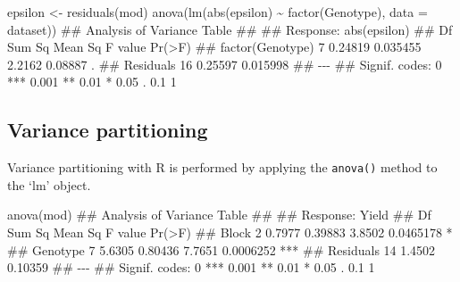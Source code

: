 \documentclass[a4paper,12pt,oneside]{book}
\newenvironment{Shaded}{\begin{snugshade}}{\end{snugshade}}
\newcommand{\SpecialCharTok}[1]{#1}
\newcommand{\DocumentationTok}[1]{#1}
\newcommand{\OtherTok}[1]{#1}
\newcommand{\FunctionTok}[1]{#1}
\newcommand{\AttributeTok}[1]{#1}
\newcommand{\NormalTok}[1]{#1}
\begin{document}
\vspace{12pt}

\begin{Shaded}
\begin{Highlighting}[]
\NormalTok{epsilon }\OtherTok{\textless{}{-}} \FunctionTok{residuals}\NormalTok{(mod)}
\FunctionTok{anova}\NormalTok{(}\FunctionTok{lm}\NormalTok{(}\FunctionTok{abs}\NormalTok{(epsilon) }\SpecialCharTok{\textasciitilde{}} \FunctionTok{factor}\NormalTok{(Genotype), }\AttributeTok{data =}\NormalTok{ dataset))}
\DocumentationTok{\#\# Analysis of Variance Table}
\DocumentationTok{\#\# }
\DocumentationTok{\#\# Response: abs(epsilon)}
\DocumentationTok{\#\#                  Df  Sum Sq  Mean Sq F value  Pr(\textgreater{}F)  }
\DocumentationTok{\#\# factor(Genotype)  7 0.24819 0.035455  2.2162 0.08887 .}
\DocumentationTok{\#\# Residuals        16 0.25597 0.015998                  }
\DocumentationTok{\#\# {-}{-}{-}}
\DocumentationTok{\#\# Signif. codes:  0 \textquotesingle{}***\textquotesingle{} 0.001 \textquotesingle{}**\textquotesingle{} 0.01 \textquotesingle{}*\textquotesingle{} 0.05 \textquotesingle{}.\textquotesingle{} 0.1 \textquotesingle{} \textquotesingle{} 1}
\end{Highlighting}
\end{Shaded}

\hypertarget{variance-partitioning-1}{%
\subsection{Variance partitioning}\label{variance-partitioning-1}}

Variance partitioning with R is performed by applying the \texttt{anova()} method to the `lm' object.

\vspace{12pt}

\begin{Shaded}
\begin{Highlighting}[]
\FunctionTok{anova}\NormalTok{(mod)}
\DocumentationTok{\#\# Analysis of Variance Table}
\DocumentationTok{\#\# }
\DocumentationTok{\#\# Response: Yield}
\DocumentationTok{\#\#           Df Sum Sq Mean Sq F value    Pr(\textgreater{}F)    }
\DocumentationTok{\#\# Block      2 0.7977 0.39883  3.8502 0.0465178 *  }
\DocumentationTok{\#\# Genotype   7 5.6305 0.80436  7.7651 0.0006252 ***}
\DocumentationTok{\#\# Residuals 14 1.4502 0.10359                      }
\DocumentationTok{\#\# {-}{-}{-}}
\DocumentationTok{\#\# Signif. codes:  0 \textquotesingle{}***\textquotesingle{} 0.001 \textquotesingle{}**\textquotesingle{} 0.01 \textquotesingle{}*\textquotesingle{} 0.05 \textquotesingle{}.\textquotesingle{} 0.1 \textquotesingle{} \textquotesingle{} 1}
\end{Highlighting}
\end{Shaded}
\end{document}
